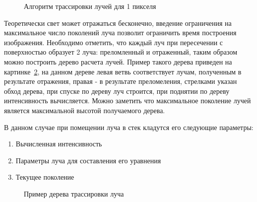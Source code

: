 \documentclass[a4paper,14pt,unknownkeysallowed]{extreport}
\begin{document}
\begin{figure}[H]
	\centering
	
	\caption{Алгоритм трассировки лучей для 1 пикселя}
	\label{fig:raytrace_algo_pixel}
\end{figure}

Теоретически свет может отражаться бесконечно, введение ограничения на максимальное число поколений луча позволит ограничить время построения изображения.
Необходимо отметить, что каждый луч при пересечении с поверхностью образует 2 луча: преломленный и отраженный, таким образом можно построить дерево расчета лучей.
Пример такого дерева приведен на картинке~\ref{fig:raytrace_tree}, на данном дереве левая ветвь соответствует лучам, полученным в результате отражения, правая - в результате преломеления,
стрелками указан обход дерева, при спуске по дереву луч строится, при поднятии по дереву интенсивность вычисляется. Можно заметить что максимальное поколение лучей является максимальной высотой получаемого дерева.

В данном случае при помещении луча в стек кладутся его следующие параметры:
\begin{enumerate}
	\item Вычисленная интенсивность 
	\item Параметры луча для составления его уравнения 
	\item Текущее поколение \cite{Rodgers}
\end{enumerate}



\begin{figure}[h]
	\centering
	
	\caption{Пример дерева трассировки луча}
	\label{fig:raytrace_tree}
\end{figure}
\end{document}
